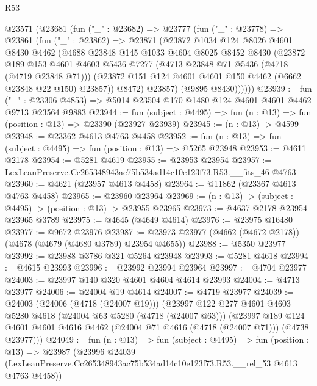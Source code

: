 \begin{lexlean}{R53}
\begin{coremodule}
    @23571
      (@23681
        (fun ("_" : @23682) =>
        @23777
          (fun ("_" : @23778) =>
          @23861
            (fun ("_" : @23862) =>
            @23871
              (@23872
                @1034
                @124
                @8026
                @4601
                @8430
                @4462
                (@4688
                  @23848
                  @145
                  @1033
                  @4604
                  @8025
                  @8452
                  @8430
                  (@23872
                    @189
                    @153
                    @4601
                    @4603
                    @5436
                    @7277
                    (@4713 @23848 @71 @5436 (@4718 (@4719 @23848 @71)))
                    (@23872 @151 @124 @4601 @4601 @150 @4462 (@6662 @23848 @22 @150) @23857))
                  @8472)
                @23857)
              (@9895 @8430))))))
@23939 := fun ("_" : @23306 @4853) =>
  @5014 @23504 @170 @1480 @124 @4601 @4601 @4462 @9713 @23564 @9883
@23944 := fun (subject : @4495) => fun (n : @13) => fun (position : @13) => @23390 (@23927 @23939)
@23945 := (n : @13) -> @4599
@23948 := @23362 @4613 @4763 @4458
@23952 := fun (n : @13) => fun (subject : @4495) => fun (position : @13) => @5265 @23948
@23953 := @4611 @2178
@23954 := @5281 @4619
@23955 := @23953 @23954
@23957 := LexLeanPreserve.Cc265348943ac75b534ad14c10e123f73.R53.__fits_46 @4763
@23960 := @4621 (@23957 @4613 @4458)
@23964 := @11862 (@23367 @4613 @4763 @4458)
@23965 := @23960 @23964
@23969 := (n : @13) -> (subject : @4495) -> (position : @13) -> @23955 @23965
@23973 := @4637 @2178 @23954 @23965 @3789
@23975 := @4645 (@4649 @4614)
@23976 := @23975 @16480
@23977 := @9672 @23976
@23987 := @23973 @23977 (@4662 (@4672 @2178)) (@4678 (@4679 (@4680 @3789) @23954 @4655))
@23988 := @5350 @23977
@23992 := @23988 @3786 @321 @5264 @23948
@23993 := @5281 @4618
@23994 := @4615 @23993
@23996 := @23992 @23994 @23964
@23997 := @4704 @23977
@24003 := @23997 @140 @320 @4601 @4604 @4614 @23993
@24004 := @4713 @23977
@24006 := @24004 @19 @4614
@24007 := @4719 @23977
@24039 := @24003
    (@24006 (@4718 (@24007 @19)))
    (@23997
      @122
      @277
      @4601
      @4603
      @5280
      @4618
      (@24004 @63 @5280 (@4718 (@24007 @63)))
      (@23997
        @189
        @124
        @4601
        @4601
        @4616
        @4462
        (@24004 @71 @4616 (@4718 (@24007 @71)))
        (@4738 @23977)))
@24049 := fun (n : @13) =>
  fun (subject : @4495) =>
  fun (position : @13) =>
  @23987
    (@23996
      @24039
      (LexLeanPreserve.Cc265348943ac75b534ad14c10e123f73.R53.__rel_53 @4613 @4763 @4458))

\end{coremodule}
\end{lexlean}
